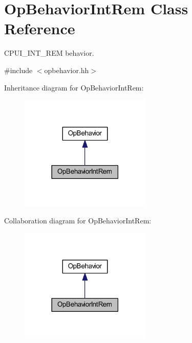\hypertarget{class_op_behavior_int_rem}{}\section{Op\+Behavior\+Int\+Rem Class Reference}
\label{class_op_behavior_int_rem}


C\+P\+U\+I\+\_\+\+I\+N\+T\+\_\+\+R\+EM behavior.  




{\ttfamily \#include $<$opbehavior.\+hh$>$}



Inheritance diagram for Op\+Behavior\+Int\+Rem\+:
\nopagebreak
\begin{figure}[H]
\begin{center}
\leavevmode
\includegraphics[width=177pt]{class_op_behavior_int_rem__inherit__graph}
\end{center}
\end{figure}


Collaboration diagram for Op\+Behavior\+Int\+Rem\+:
\nopagebreak
\begin{figure}[H]
\begin{center}
\leavevmode
\includegraphics[width=177pt]{class_op_behavior_int_rem__coll__graph}
\end{center}
\end{figure}
